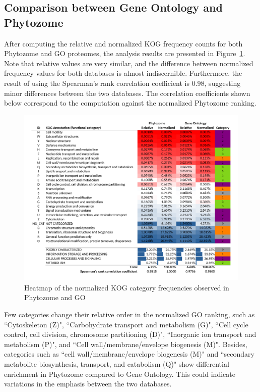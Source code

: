 \subsection{Comparison between Gene Ontology and Phytozome}
\label{sec:results.phytozome-go}

After computing the relative and normalized KOG frequency 
counts for both Phytozome and GO proteomes, the analysis 
results are presented in Figure~\ref{fig:GO}. Note that 
relative values are very similar, and the difference between 
normalized frequency values for both databases 
is almost indiscernible. Furthermore, the result 
of using the Spearman's rank correlation coefficient is 0.98, 
suggesting minor differences between the two databases. The 
correlation coefficients shown below correspond to the 
computation against the normalized Phytozome ranking.

\begin{figure}[htp!]
\centering
\includegraphics[width=\textwidth]{figures/Heatmap_GO}
\caption{Heatmap of the normalized KOG category frequencies 
observed in Phytozome and GO}
\label{fig:GO}
\end{figure}

Few categories change their relative order in the normalized 
GO ranking, such as ``Cytoskeleton (Z)", ``Carbohydrate 
transport and metabolism (G)", ``Cell cycle control, cell 
division, chromosome partitioning (D)", ``Inorganic ion 
transport and metabolism (P)", and 
``Cell wall/membrane/envelope biogenesis (M)". Besides, 
categories such as ``cell wall/membrane/envelope 
biogenesis (M)" and ``secondary metabolite biosynthesis, 
transport, and catabolism (Q)" show differential 
enrichment in Phytozome compared to Gene Ontology. 
This could indicate variations in the emphasis between 
the two databases.

